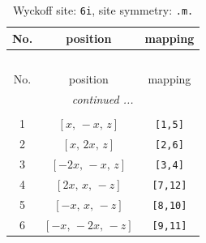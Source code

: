 \documentclass[fleqn,8pt]{jsarticle}
\begin{document}
\renewcommand{\arraystretch}{1.2}
\begin{longtable}{ccc}
\caption{Wyckoff site: {\tt 6i}, site symmetry: {\tt .m.}}
 \\
 \hline \hline
No. & position & mapping \\ \hline \endfirsthead

\multicolumn{2}{l}{\tablename\ \thetable{}} \\
 \hline \hline
No. & position & mapping \\ \hline \endhead

 \hline \hline
\multicolumn{2}{r}{\footnotesize\it continued ...} \\ \endfoot

 \hline \hline
\multicolumn{2}{r}{} \\ \endlastfoot

1 & $\left[ x,\, - x,\, z \right]$ & {\tt [1,5]} \\ \hline
2 & $\left[ x,\, 2 x,\, z \right]$ & {\tt [2,6]} \\ \hline
3 & $\left[ - 2 x,\, - x,\, z \right]$ & {\tt [3,4]} \\ \hline
4 & $\left[ 2 x,\, x,\, - z \right]$ & {\tt [7,12]} \\ \hline
5 & $\left[ - x,\, x,\, - z \right]$ & {\tt [8,10]} \\ \hline
6 & $\left[ - x,\, - 2 x,\, - z \right]$ & {\tt [9,11]} \\
\end{longtable}
\renewcommand{\arraystretch}{1.2}
\end{document}

